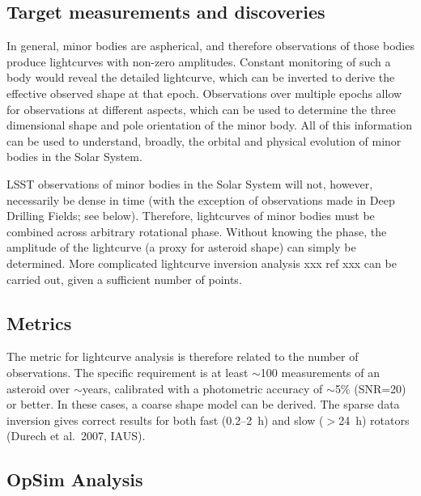 
\subsection{Target measurements and discoveries}
\label{sec:\secname:targets}

In general, minor bodies are aspherical,
and therefore observations of those bodies
produce lightcurves with non-zero amplitudes.
Constant monitoring of such a body would
reveal the detailed lightcurve, which can
be inverted to derive the effective observed
shape at that epoch.
Observations
over multiple epochs allow for observations
at different aspects, which can be used to
determine the three dimensional shape and pole
orientation of the minor body. All of this
information can be used to understand,
broadly, the orbital and physical evolution
of minor bodies in the Solar System.

LSST observations of minor bodies in the Solar System
will not, however, necessarily be dense in time
(with the exception of observations made in
Deep Drilling Fields; see below).
Therefore, lightcurves of minor bodies must
be combined across arbitrary rotational phase.
Without knowing the phase, the amplitude of
the lightcurve (a proxy for
asteroid shape) can simply be determined.
More complicated lightcurve inversion analysis
xxx ref xxx
can be carried out, given a sufficient number
of points.



\subsection{Metrics}
\label{sec:\secname:metrics}

The metric for lightcurve analysis
is therefore related to the number
of observations. The specific requirement
is
at least $\sim$100 measurements of an asteroid over
$\sim$years,
calibrated with a photometric accuracy of
$\sim$5\% (SNR=20)
or better. In these cases,
a coarse shape model can be derived.
The sparse data inversion gives correct results for both fast (0.2--2~h) and slow ($>$24~h) rotators (Durech et al.\ 2007, IAUS).




\subsection{OpSim Analysis}
\label{sec:\secname:analysis}

